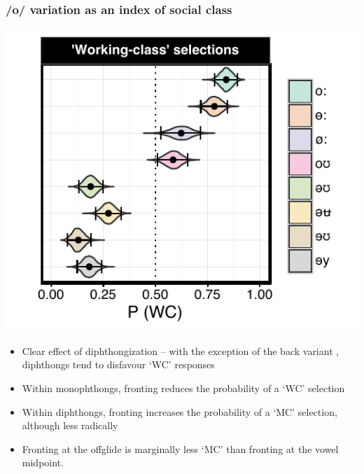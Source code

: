 \documentclass[a0,final]{a0poster}
\begin{document}
\begin{multicols*}{4}
\subsubsection*{/o/ variation as an index of social class}
\vspace*{-1cm}
\begin{minipage}{0.12\textwidth}
\vspace*{-2.75cm}
\raggedright
\hspace*{-2.5cm}
\includegraphics[scale=2.2]{ow_class_effects.pdf}
\end{minipage}
\hspace*{1.75cm}
\begin{minipage}{0.105\textwidth}
\vspace*{2cm}
\raggedright
\begin{itemize}
\item{Clear effect of diphthongization -- with the exception of the back variant \textipa{[oU]}, diphthongs tend to disfavour `WC' responses}
\item{Within monophthongs, fronting reduces the probability of a `WC' selection}
\item{Within diphthongs, fronting increases the probability of a `MC' selection, although less radically}
\item{Fronting at the offglide is marginally less `MC' than fronting at the vowel midpoint.}
\end{itemize}
\end{minipage}

\end{multicols*}
\end{document}
